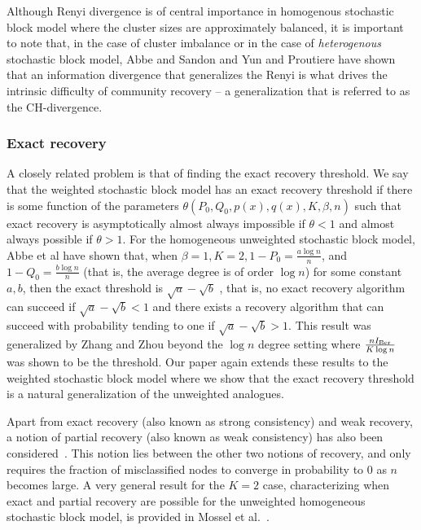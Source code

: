 Although Renyi divergence is of central importance in homogenous stochastic block model where the cluster sizes are approximately balanced, it is important to note that, in the case of cluster imbalance or in the case of \emph{heterogenous} stochastic block model, Abbe and Sandon \cite{AbbSan15} and Yun and Proutiere \cite{yun2016optimal} have shown that an information divergence that generalizes the Renyi is what drives the intrinsic difficulty of community recovery -- a generalization that is referred to as the CH-divergence.


\subsubsection{Exact recovery}

A closely related problem is that of finding the exact recovery threshold. We say that the weighted stochastic block model has an exact recovery threshold if there is some function of the parameters $\theta(P_0, Q_0, p(x), q(x), K, \beta, n)$ such that exact recovery is asymptotically almost always impossible if $\theta < 1$ and almost always possible if $\theta > 1$. For the homogeneous unweighted stochastic block model, Abbe et al \cite{abbe2014exact} have shown that, when $\beta=1, K=2, 1 - P_0 = \frac{a \log n}{n}$, and $1 - Q_0 = \frac{b \log n}{n}$  (that is, the average degree is of order $\log n$) for some constant $a,b$, then the exact threshold is $\sqrt{a} - \sqrt{b}$ , that is, no exact recovery algorithm can succeed if $\sqrt{a} - \sqrt{b} < 1$ and there exists a recovery algorithm that can succeed with probability tending to one if $\sqrt{a} - \sqrt{b} > 1$.  This result was generalized by Zhang and Zhou \cite{zhangminimax} beyond the $\log n$ degree setting where $ \frac{n I_{\textrm{Ber}}}{K \log n}$ was shown to be the threshold. Our paper again extends these results to the weighted stochastic block model where we show that the exact recovery threshold is a natural generalization of the unweighted analogues. 

Apart from exact recovery (also known as strong consistency) and weak recovery, a notion of partial recovery (also known as weak consistency) has also been considered~\cite{MosEtal14, AminiEtal13, zhangminimax}. This notion lies between the other two notions of recovery, and only requires the fraction of misclassified nodes to converge in probability to 0 as $n$ becomes large. A very general result for the $K=2$ case, characterizing when exact and partial recovery are possible for the unweighted homogeneous stochastic block model, is provided in Mossel et al.~\cite{MosEtal14}.



